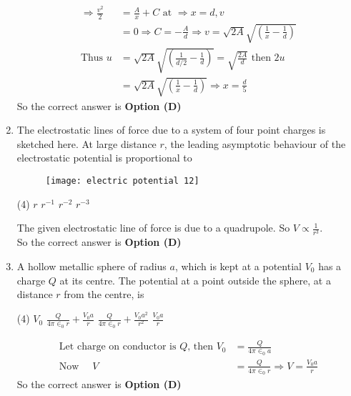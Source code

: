 \begin{enumerate}
\begin{answer}
\begin{align*}
		\Rightarrow \frac{v^{2}}{2}&=\frac{A}{x}+C\text{ at }\Rightarrow x=d, v\\&=0 \Rightarrow C=-\frac{A}{d} \Rightarrow v=\sqrt{2 A} \sqrt{\left(\frac{1}{x}-\frac{1}{d}\right)}\\
		\text{Thus }u&=\sqrt{2 A} \sqrt{\left(\frac{1}{d / 2}-\frac{1}{d}\right)}=\sqrt{\frac{2 A}{d}}\text{ then }2 u\\&=\sqrt{2 A} \sqrt{\left(\frac{1}{x}-\frac{1}{d}\right)} \Rightarrow x=\frac{d}{5}
		\end{align*}
		So the correct answer is \textbf{Option (D)}
	\end{answer}
	\item  The electrostatic lines of force due to a system of four point charges is sketched here. At large distance $r$, the leading asymptotic behaviour of the electrostatic potential is proportional to
	{}
	\begin{figure}[H]
		\centering
		\texttt{[image: electric potential 12]}
	\end{figure}
	\begin{tasks}(4)
		\task[\textbf{A.}] $r$
		\task[\textbf{B.}] $r^{-1}$
		\task[\textbf{C.}] $r^{-2}$
		\task[\textbf{D.}] $r^{-3}$
	\end{tasks}
	\begin{answer}
		The given electrostatic line of force is due to a quadrupole. So $V \propto \frac{1}{r^{3}}$.\\
		So the correct answer is \textbf{Option (D)}
	\end{answer}
	\item A hollow metallic sphere of radius $a$, which is kept at a potential $V_{0}$ has a charge $Q$ at its centre. The potential at a point outside the sphere, at a distance $r$ from the centre, is
	{}
	\begin{tasks}(4)
		\task[\textbf{A.}] $V_{0}$
		\task[\textbf{B.}] $\frac{Q}{4 \pi \in_{0} r}+\frac{V_{0} a}{r}$
		\task[\textbf{C.}] $\frac{Q}{4 \pi \in_{0} r}+\frac{V_{0} a^{2}}{r^{2}}$
		\task[\textbf{D.}] $\frac{V_{0} a}{r}$
	\end{tasks}
	\begin{answer}
		\begin{align*}
		\text{Let charge on conductor is $Q$, then }V_{0}&=\frac{Q}{4 \pi \in_{0} a}\\
		\text{Now }\quad V&=\frac{Q}{4 \pi \in_{0} r} \Rightarrow V=\frac{V_{0} a}{r}
		\end{align*}
		So the correct answer is \textbf{Option (D)}

\end{answer}
\end{enumerate}
